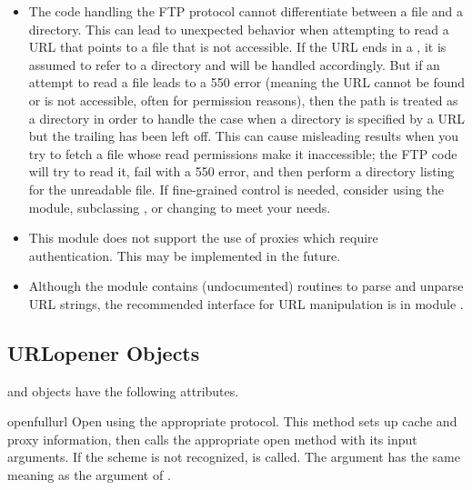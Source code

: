 \begin{itemize}
\item
The code handling the FTP protocol cannot differentiate
between a file and a directory.  This can lead to unexpected behavior
when attempting to read a URL that points to a file that is not
accessible.  If the URL ends in a \code{/}, it is assumed to refer to
a directory and will be handled accordingly.  But if an attempt to
read a file leads to a 550 error (meaning the URL cannot be found or
is not accessible, often for permission reasons), then the path is
treated as a directory in order to handle the case when a directory is
specified by a URL but the trailing \code{/} has been left off.  This can
cause misleading results when you try to fetch a file whose read
permissions make it inaccessible; the FTP code will try to read it,
fail with a 550 error, and then perform a directory listing for the
unreadable file. If fine-grained control is needed, consider using the
 module, subclassing , or changing
 to meet your needs.

\item
This module does not support the use of proxies which require
authentication.  This may be implemented in the future.

\item
Although the  module contains (undocumented) routines
to parse and unparse URL strings, the recommended interface for URL
manipulation is in module .

\end{itemize}


\subsection{URLopener Objects \label{urlopener-objs}}

 and  objects have the
following attributes.

\begin{methoddesc}[URLopener]{open}{fullurl}
Open  using the appropriate protocol.  This method sets
up cache and proxy information, then calls the appropriate open method with
its input arguments.  If the scheme is not recognized,
 is called.  The  argument
has the same meaning as the  argument of .
\end{methoddesc}

